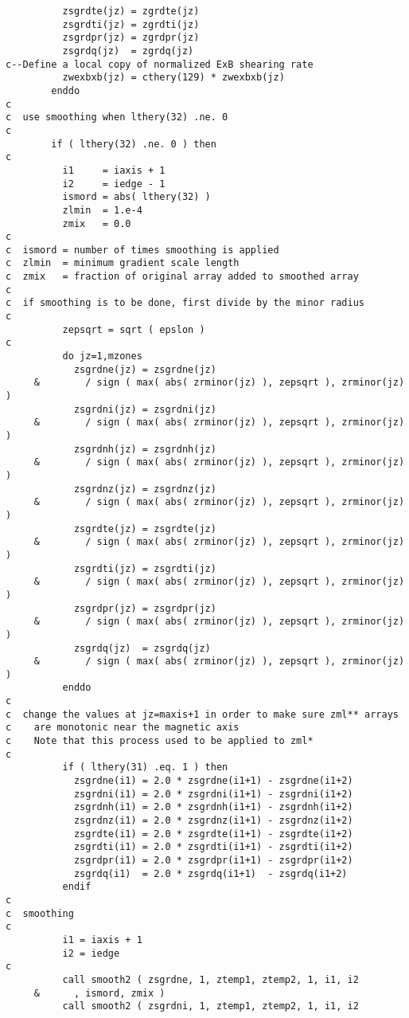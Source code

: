 \begin{verbatim}
          zsgrdte(jz) = zgrdte(jz)
          zsgrdti(jz) = zgrdti(jz)
          zsgrdpr(jz) = zgrdpr(jz)
          zsgrdq(jz)  = zgrdq(jz)
c--Define a local copy of normalized ExB shearing rate
          zwexbxb(jz) = cthery(129) * zwexbxb(jz)
        enddo
c
c  use smoothing when lthery(32) .ne. 0
c
        if ( lthery(32) .ne. 0 ) then
c
          i1     = iaxis + 1
          i2     = iedge - 1
          ismord = abs( lthery(32) )
          zlmin  = 1.e-4
          zmix   = 0.0
c
c  ismord = number of times smoothing is applied
c  zlmin  = minimum gradient scale length
c  zmix   = fraction of original array added to smoothed array
c
c  if smoothing is to be done, first divide by the minor radius
c
          zepsqrt = sqrt ( epslon )
c
          do jz=1,mzones
            zsgrdne(jz) = zsgrdne(jz)
     &        / sign ( max( abs( zrminor(jz) ), zepsqrt ), zrminor(jz) )
            zsgrdni(jz) = zsgrdni(jz)
     &        / sign ( max( abs( zrminor(jz) ), zepsqrt ), zrminor(jz) )
            zsgrdnh(jz) = zsgrdnh(jz)
     &        / sign ( max( abs( zrminor(jz) ), zepsqrt ), zrminor(jz) )
            zsgrdnz(jz) = zsgrdnz(jz)
     &        / sign ( max( abs( zrminor(jz) ), zepsqrt ), zrminor(jz) )
            zsgrdte(jz) = zsgrdte(jz)
     &        / sign ( max( abs( zrminor(jz) ), zepsqrt ), zrminor(jz) )
            zsgrdti(jz) = zsgrdti(jz)
     &        / sign ( max( abs( zrminor(jz) ), zepsqrt ), zrminor(jz) )
            zsgrdpr(jz) = zsgrdpr(jz)
     &        / sign ( max( abs( zrminor(jz) ), zepsqrt ), zrminor(jz) )
            zsgrdq(jz)  = zsgrdq(jz)
     &        / sign ( max( abs( zrminor(jz) ), zepsqrt ), zrminor(jz) )
          enddo
c
c  change the values at jz=maxis+1 in order to make sure zml** arrays
c    are monotonic near the magnetic axis
c    Note that this process used to be applied to zml*
c
          if ( lthery(31) .eq. 1 ) then
            zsgrdne(i1) = 2.0 * zsgrdne(i1+1) - zsgrdne(i1+2)
            zsgrdni(i1) = 2.0 * zsgrdni(i1+1) - zsgrdni(i1+2)
            zsgrdnh(i1) = 2.0 * zsgrdnh(i1+1) - zsgrdnh(i1+2)
            zsgrdnz(i1) = 2.0 * zsgrdnz(i1+1) - zsgrdnz(i1+2)
            zsgrdte(i1) = 2.0 * zsgrdte(i1+1) - zsgrdte(i1+2)
            zsgrdti(i1) = 2.0 * zsgrdti(i1+1) - zsgrdti(i1+2)
            zsgrdpr(i1) = 2.0 * zsgrdpr(i1+1) - zsgrdpr(i1+2)
            zsgrdq(i1)  = 2.0 * zsgrdq(i1+1)  - zsgrdq(i1+2)
          endif
c
c  smoothing
c
          i1 = iaxis + 1
          i2 = iedge
c
          call smooth2 ( zsgrdne, 1, ztemp1, ztemp2, 1, i1, i2
     &      , ismord, zmix )
          call smooth2 ( zsgrdni, 1, ztemp1, ztemp2, 1, i1, i2

\end{verbatim}
